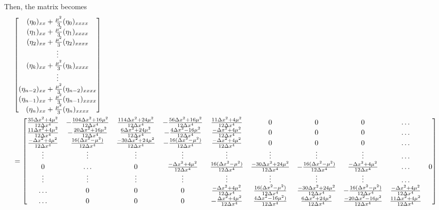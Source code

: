 \documentclass[10pt,reqno,oneside,a4paper]{article}
\begin{document}
Then, the matrix becomes
\begin{align*}
&\begin{bmatrix}
(\eta_0)_{xx} + \frac{\mu^2}{3} (\eta_0)_{xxxx} \\
(\eta_1)_{xx} + \frac{\mu^2}{3} (\eta_1)_{xxxx} \\
(\eta_2)_{xx} + \frac{\mu^2}{3} (\eta_2)_{xxxx} \\
\vdots \\
(\eta_k)_{xx} + \frac{\mu^2}{3} (\eta_k)_{xxxx} \\
\vdots \\
(\eta_{n-2})_{xx} + \frac{\mu^2}{3} (\eta_{n-2})_{xxxx} \\
(\eta_{n-1})_{xx} + \frac{\mu^2}{3} (\eta_{n-1})_{xxxx} \\
(\eta_{n})_{xx} + \frac{\mu^2}{3} (\eta_{n})_{xxxx}
\end{bmatrix} \\
&=
\begin{bmatrix}
\frac{35\Delta x^2 + 4 \mu^2}{12\Delta x^4} & - \frac{104 \Delta x^2 + 16\mu^2}{12\Delta x^4} & \frac{114 \Delta x^2 + 24 \mu^2}{12\Delta x^4} & - \frac{56 \Delta x^2 + 16\mu^2}{12\Delta x^4} & \frac{11 \Delta x^2 + 4\mu^2}{12\Delta x^4} & 0 & 0 & 0 & \ldots \\
\frac{11\Delta x^2 + 4 \mu^2}{12\Delta x^4} & - \frac{20 \Delta x^2 + 16\mu^2}{12\Delta x^4} & \frac{6 \Delta x^2 + 24 \mu^2}{12\Delta x^4} & - \frac{4 \Delta x^2 - 16\mu^2}{12\Delta x^4} & \frac{- \Delta x^2 + 4\mu^2}{12\Delta x^4} & 0 & 0 & 0 & \ldots\\
\frac{-\Delta x^2 + 4 \mu^2}{12\Delta x^4} & \frac{16 (\Delta x^2 -\mu^2)}{12\Delta x^4} & \frac{-30\Delta x^2 + 24 \mu^2}{12\Delta x^4} & - \frac{16(\Delta x^2 - \mu^2)}{12\Delta x^4} & \frac{- \Delta x^2 + 4\mu^2}{12\Delta x^4} & 0 & 0 & 0 & \ldots \\
\vdots & \vdots & \vdots & \vdots & \vdots & \vdots &\vdots & \vdots & \ldots \\
0 & \ldots & 0 & \frac{-\Delta x^2 + 4 \mu^2}{12\Delta x^4} & \frac{16 (\Delta x^2 -\mu^2)}{12\Delta x^4} & \frac{-30\Delta x^2 + 24 \mu^2}{12\Delta x^4} & - \frac{16(\Delta x^2 - \mu^2)}{12\Delta x^4} & \frac{- \Delta x^2 + 4\mu^2}{12\Delta x^4} & \ldots & 0 \\
\vdots & \vdots & \vdots & \vdots & \vdots & \vdots &\vdots & \vdots & \ldots \\
\ldots & 0 & 0 & 0 & \frac{-\Delta x^2 + 4 \mu^2}{12\Delta x^4} & \frac{16 (\Delta x^2 -\mu^2)}{12\Delta x^4} & \frac{-30\Delta x^2 + 24 \mu^2}{12\Delta x^4} & - \frac{16(\Delta x^2 - \mu^2)}{12\Delta x^4} & \frac{- \Delta x^2 + 4\mu^2}{12\Delta x^4}  \\
\ldots & 0 & 0 & 0 & -\frac{\Delta x^2 + 4 \mu^2}{12\Delta x^4} & \frac{4 \Delta x^2 -16\mu^2)}{12\Delta x^4} & \frac{6\Delta x^2 + 24 \mu^2}{12\Delta x^4} & \frac{-20\Delta x^2 -16 \mu^2}{12\Delta x^4} & \frac{11 \Delta x^2 + 4\mu^2}{12\Delta x^4} \\

\end{bmatrix}
\end{align*}
\end{document}
